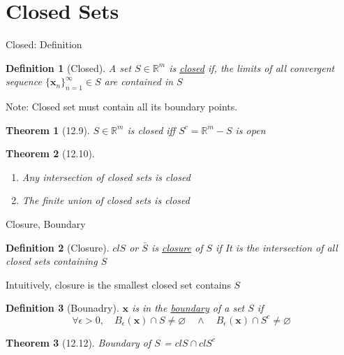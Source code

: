 \documentclass[final]{beamer}
\newtheorem{defn}{Definition}
\newtheorem{thm}{Theorem}
\begin{document}

\section{Closed Sets} %
\label{sec:closed_sets}
\begin{frame}[t]{Closed: Definition}
	\begin{defn}
		[Closed]
		A set $S\in\mathbb{R}^m$ is \uline{closed} if, the limits of all convergent sequence $\{\mathbf{x}_n\}_{n=1}^\infty\in S$ are contained in $S$
	\end{defn}
	Note: Closed set must contain all its boundary points. 
	\begin{thm}
		[12.9] $S\in\mathbb{R}^m$ is closed iff $S^c=\mathbb{R}^m - S$ is open
	\end{thm}
	\begin{thm}
		[12.10]
		\begin{enumerate}
			\item Any intersection of closed sets is closed
			\item The finite union of closed sets is closed
		\end{enumerate}
	\end{thm}
\end{frame}
\begin{frame}[t]{Closure, Boundary}
	\begin{defn}
		[Closure] $cl S$ or $\bar S$ is \uline{closure} of $S$ if It is the intersection of all closed sets containing $S$
	\end{defn}
	Intuitively, closure is the smallest closed set contains $S$
	\begin{defn}
		[Bounadry] $\mathbf{x}$ is in the \uline{boundary} of a set $S$ if \[
			\forall \epsilon>0, \quad B_\epsilon(\mathbf{x})\cap S \neq \varnothing \quad\land\quad B_\epsilon(\mathbf{x})\cap S^c \neq \varnothing
		\]
	\end{defn}
	\begin{thm}
		[12.12] Boundary of $S$ = $cl S \cap cl S^c$
	\end{thm}
\end{frame}
\end{document}
